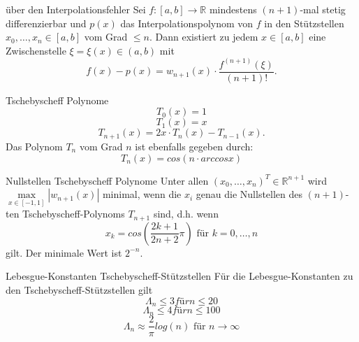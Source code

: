 \begin{flashcard}[Satz]{über den Interpolationsfehler}
Sei $f: [a,b] \rightarrow \mathbb{R}$ mindestens $(n+1)$-mal stetig differenzierbar und $p(x)$
das Interpolationspolynom von $f$ in den Stützstellen $x_0, \ldots , x_n \in [a,b]$ vom Grad $\leq n$.
Dann existiert zu jedem $x \in [a,b]$ eine Zwischenstelle $\xi = \xi(x) \in (a,b)$ mit
$$
	f(x)-p(x) = w_{n+1}(x) \cdot \frac{f^{(n+1)}(\xi)}{(n+1)!}.
$$
\end{flashcard}

\begin{flashcard}[Definition]{Tschebyscheff Polynome}
$$
	T_0(x) = 1
$$
$$
	T_1(x) = x
$$
$$
	T_{n+1}(x) = 2x \cdot T_n(x) - T_{n-1}(x).
$$
Das Polynom $T_n$ vom Grad $n$ ist ebenfalls gegeben durch:
$$
	T_n(x) = cos(n \cdot arccos x)
$$
\end{flashcard}

\begin{flashcard}[Satz]{Nullstellen Tschebyscheff Polynome}
Unter allen $(x_0, \ldots, x_n)^T \in \mathbb{R}^{n+1}$ wird $\max\limits_{x \in [-1,1]} |w_{n+1}(x)|$
minimal, wenn die $x_i$ genau die Nullstellen des $(n+1)$-ten Tschebyscheff-Polynoms $T_{n+1}$ sind, d.h. wenn
$$
	x_k = cos\left(\frac{2k+1}{2n+2} \pi\right) \text{ für } k=0, \ldots , n
$$
gilt. Der minimale Wert ist $2^{-n}$.

\end{flashcard}

\begin{flashcard}[Satz]{Lebesgue-Konstanten Tschebyscheff-Stützstellen}
Für die Lebesgue-Konstanten zu den Tschebyscheff-Stützstellen gilt
$$
	\Lambda_n \leq 3 für n \leq 20
$$
$$
	\Lambda_n \leq 4 für n \leq 100
$$
$$
	\Lambda_n \approx \frac{2}{\pi} log(n) \text{ für }  n \rightarrow \infty
$$

\end{flashcard}
